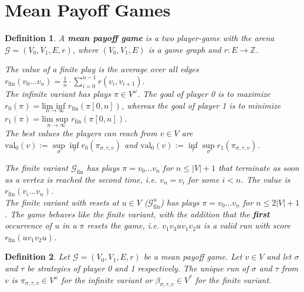 \documentclass{article}
\newtheorem{definition}{Definition}
\begin{document}
\section{Mean Payoff Games}
\begin{definition}
	A \textbf{mean payoff game} is a two player-game with the arena $\mathcal{G} = (V_0, V_1, E, r)$, where $(V_0, V_1, E)$ is a game graph and $r : E \rightarrow \mathbb{Z}$. 
	
	The value of a finite play is the average over all edges $r_\text{fin}(v_0 \dots v_n) = \frac{1}{n} \cdot \sum\limits_{i=0}^{n-1} r(v_i, v_{i+1})$.  \\
	
	The infinite variant has plays $\pi \in V^\omega$. The goal of player 0 is to maximize $r_0(\pi) = \underset{n \rightarrow \infty}{\text{lim inf }} r_\text{fin}(\pi[0,n])$, whereas the goal of player 1 is to minimize $r_1(\pi) = \underset{n \rightarrow \infty}{\text{lim sup }} r_\text{fin}(\pi[0,n])$. \\
	The best values the players can reach from $v \in V$ are $\text{val}_0(v) := \sup\limits_\sigma \inf\limits_\tau r_0(\pi_{\sigma,\tau,v})$ and $\text{val}_0(v) := \inf\limits_\tau \sup\limits_\sigma r_1(\pi_{\sigma,\tau,v})$.
	
	The finite variant $\mathcal{G}_\text{fin}$ has plays $\pi = v_0 \dots v_n$ for $n \leq |V|+1$ that terminate as soon as a vertex is reached the second time, i.e. $v_n = v_i$ for some $i < n$. The value is $r_\text{fin}(v_i \dots v_n)$. \\
	
	The finite variant with resets at $u \in V$  ($\mathcal{G}_\text{fin}^u$) has plays $\pi = v_0 \dots v_n$ for $n \leq 2|V| + 1$. The game behaves like the finite variant, with the addition that the \textbf{first} occurrence of $u$ in a $\pi$ resets the game, i.e. $v_1 v_3 u v_1 v_2 u$ is a valid run with score $r_\text{fin}(u v_1 v_2 u)$.
\end{definition}

\begin{definition}
	Let $\mathcal{G} = (V_0, V_1, E, r)$ be a mean payoff game. Let $v \in V$ and let $\sigma$ and $\tau$ be strategies of player 0 and 1 respectively. The unique run of $\sigma$ and $\tau$ from $v$ is $\pi_{\sigma,\tau,v} \in V^\omega$ for the infinite variant or $\beta_{\sigma,\tau,v} \in V^*$ for the finite variant.
\end{definition}
\end{document}
